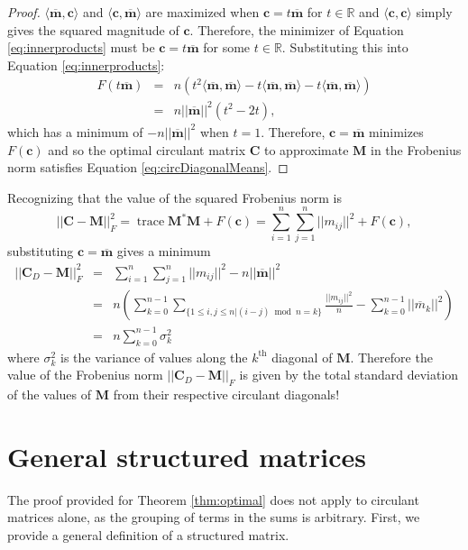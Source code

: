 \documentclass[letterpaper,12pt,oneside,final]{article}
\newcommand{\ve}[1]{\mathbf{#1}}           %
\newcommand{\m}[1]{\mathbf{#1}}               %
\newcommand{\conj}[1]{{#1}^{\ast}}
\newcommand{\norm}[1]{||{#1}||}              %
\newcommand{\frob}[1]{\norm{#1}_F}
\newcommand*{\trace}{\operatorname{trace}}
\newcommand{\widebar}[1]{\overline{#1}}
\newcommand{\field}[1]{\mathbb{#1}}
\newcommand{\Reals}{\field{R}}
\begin{document}
\begin{proof}
  $\langle \widebar{\ve{m}}, \ve{c} \rangle$ and $\langle \ve{c}, \widebar{\ve{m}} \rangle$ are maximized when $\ve{c} = t \widebar{\ve{m}}$ for $t \in \Reals$ and $\langle \ve{c}, \ve{c} \rangle$ simply gives the squared magnitude of $\ve{c}$. Therefore, the minimizer of Equation \ref{eq:innerproducts} must be $\ve{c} = t \widebar{\ve{m}}$ for some $t \in \Reals$. Substituting this into Equation \ref{eq:innerproducts}:
  \begin{eqnarray}
    F(t \widebar{\ve{m}}) & = & n \left ( t^2 \langle \widebar{\ve{m}}, \widebar{\ve{m}} \rangle - t \langle \widebar{\ve{m}}, \widebar{\ve{m}} \rangle - t \langle \widebar{\ve{m}}, \widebar{\ve{m}} \rangle \right ) \nonumber \\
    & = & n \norm{ \widebar{ \ve{m} } }^2 (t^2 - 2t),
  \end{eqnarray}
  which has a minimum of $-n \norm{ \widebar{ \ve{m} } }^2$ when $t = 1$. Therefore, $\ve{c} = \widebar{\ve{m}}$ minimizes $F(\ve{c})$ and so the optimal circulant matrix $\m{C}$ to approximate $\m{M}$ in the Frobenius norm satisfies Equation \ref{eq:circDiagonalMeans}.
\end{proof}

Recognizing that the value of the squared Frobenius norm is
$$\frob{\m{C} - \m{M}}^2 = \trace \conj{\m{M}} \m{M} + F(\ve{c}) = \sum_{i = 1}^n \sum_{j = 1}^n \norm{m_{ij}}^2 + F(\ve{c}),$$
substituting $\ve{c} = \widebar{ \ve{m} }$ gives a minimum
\begin{eqnarray} 
  \frob{\m{C}_D - \m{M}}^2 & = & \sum_{i = 1}^n \sum_{j = 1}^n \norm{m_{ij}}^2 - n \norm{ \widebar { \ve{m} } }^2 \nonumber \\
  & = & n \left ( \sum_{k = 0}^{n-1} \sum_{\{1 \leq i,j \leq n|(i-j) \bmod n = k\}} \frac{\norm{m_{ij}}^2}{n} - \sum_{k = 0}^{n-1} \norm{ \widebar{ m }_k }^2 \right ) \nonumber \\
  & = & n \sum_{k = 0}^{n-1} \sigma^2_k \label{eq:varianceMinimum}
\end{eqnarray}
where $\sigma^2_k$ is the variance of values along the $k^{\text{th}}$ diagonal of $\m{M}$. Therefore the value of the Frobenius norm $\frob{\m{C}_D - \m{M}}$ is given by the total standard deviation of the values of $\m{M}$ from their respective circulant diagonals!

\section{General structured matrices}

The proof provided for Theorem \ref{thm:optimal} does not apply to circulant matrices alone, as the grouping of terms in the sums is arbitrary. First, we provide a general definition of a structured matrix.
\end{document}
